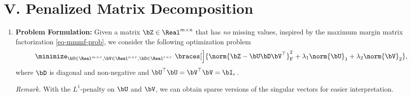 \documentclass[12pt]{article}
\begin{document}
\section*{V. Penalized Matrix Decomposition}

\begin{enumerate}[label=\textbf{\arabic*.}]

	\item \textbf{Problem Formulation:} Given a matrix $\bZ \in \Real^{m \times n}$ that has \emph{no} missing values, inspired by the maximum margin matrix factorization \eqref{eq-mmmf-prob}, we consider the following optimization problem 
	\begin{align}\label{eq-pen-matrix}
		\minimize_{\bU \in \Real^{m \times r}, \bV \in \Real^{n \times r}, \bD \in \Real^{r \times r}} \ \braces[\Big]{\norm{\bZ - \bU \bD \bV^{\top}}_{\mathrm{F}}^2 + \lambda_1 \norm{\bU}_1 + \lambda_2 \norm{\bV}_2}, 
	\end{align}
	where $\bD$ is diagonal and non-negative and $\bU^\top \bU = \bV^\top \bV = \bI_r$. 
	
	\textit{Remark.} With the $L^1$-penalty on $\bU$ and $\bV$, we can obtain sparse versions of the singular vectors for easier interpretation. 
	

\end{enumerate}
\end{document}
